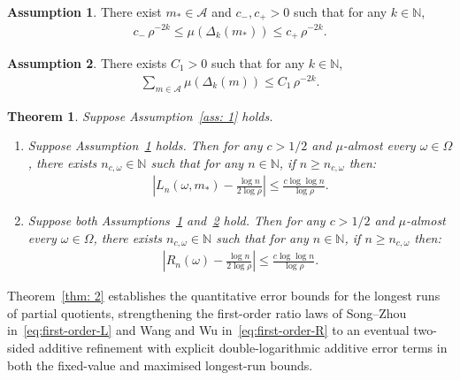 \documentclass[12pt,reqno]{amsart}
\theoremstyle{definition}
\newtheorem{assumption}{Assumption}
\theoremstyle{plain}
\newtheorem{thm}{Theorem}
\begin{document}
\begin{assumption}\label{ass: 2}
There exist $m_*\in\mathcal{A}$ and $c_-,c_+>0$ such that for any $k\in\mathbb{N}$,
\begin{align}\label{eq: ass 2}
    c_-\,\rho^{-2k}
    \leq \mu{\left(\Delta_k{\left({m_*}\right)}\right)}
    \leq c_+\,\rho^{-2k}.
\end{align}
\end{assumption}
\begin{assumption}\label{ass: 3}
There exists $C_1>0$ such that for any $k\in\mathbb{N}$,
\begin{align}\label{eq: ass 3}
    \sum_{m\in\mathcal{A}} \mu{\left(\Delta_k{\left({m}\right)}\right)}
    \leq C_1\,\rho^{-2k}.
\end{align}
\end{assumption}

\begin{thm}\label{thm: 1}
Suppose Assumption~\ref{ass: 1} holds.
\begin{enumerate}[leftmargin=*]
\item 
Suppose Assumption~\ref{ass: 2} holds.
Then for any $c>1/2$ and $\mu$-almost every $\omega\in\Omega$, there exists $n_{c,\omega}\in\mathbb{N}$ such that for any $n\in\mathbb{N}$, if $n\geq n_{c,\omega}$ then:
\begin{align*}
    \left|L_n(\omega,m_*)-\frac{\log n}{2\log\rho}\right|
    \leq \frac{c\log{\log{n}}}{\log{\rho}}.
\end{align*}
\item
Suppose both Assumptions~\ref{ass: 2} and~\ref{ass: 3} hold.
Then for any $c>1/2$ and $\mu$-almost every $\omega\in\Omega$, there exists $n_{c,\omega}\in\mathbb{N}$ such that for any $n\in\mathbb{N}$, if $n\geq n_{c,\omega}$ then:
\begin{align*}
    \left|R_n(\omega)-\frac{\log n}{2\log\rho}\right|\leq \frac{c\log{\log{n}}}{\log{\rho}}.
\end{align*}
\end{enumerate}
\end{thm}

Theorem~\ref{thm: 2} establishes the quantitative error bounds for the longest runs of partial quotients, strengthening the first-order ratio laws of Song--Zhou in~\eqref{eq:first-order-L} and Wang and Wu in~\eqref{eq:first-order-R} to an eventual two-sided additive refinement with explicit double-logarithmic additive error terms in both the fixed-value and maximised longest-run bounds.
\end{document}
